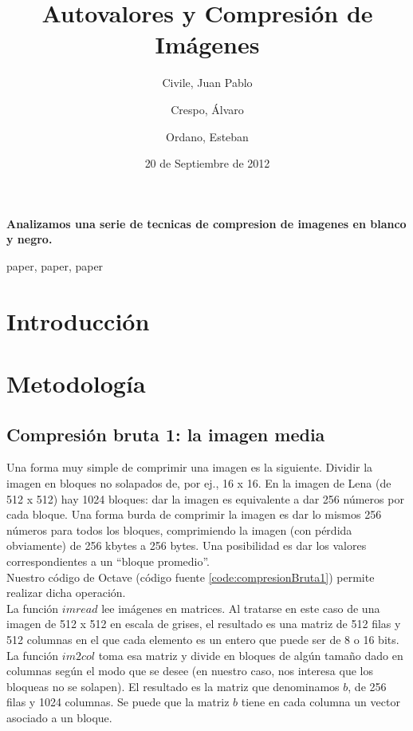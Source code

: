\documentclass[twocolumn,a4paper,10pt]{article}
\title{Autovalores y Compresión de Imágenes}
\date{20 de Septiembre de 2012}
\author{Civile, Juan Pablo \and Crespo, Álvaro \and Ordano, Esteban }
\begin{document}
\pagestyle{fancy}
\maketitle
\thispagestyle{fancy}

\begin{customabstract}
\textbf{
    Analizamos una serie de tecnicas de compresion de imagenes en blanco y negro.
}
\end{customabstract}

\begin{keywords}
paper, paper, paper
\end{keywords}


\section{Introducci\'on}


\section{Metodología}

\subsection{Compresi\'on bruta 1: la imagen media}
\label{sec:compresion1}

Una forma muy simple de comprimir una imagen es la siguiente. Dividir la imagen en bloques no solapados de, por ej., 16 x 16. En la imagen de Lena (de 512 x 512) 
hay 1024 bloques: dar la imagen es equivalente a dar 256 n\'umeros por cada bloque. Una forma burda de comprimir la imagen es dar lo mismos 256 n\'umeros para todos 
los bloques, comprimiendo la imagen (con p\'erdida obviamente) de 256 kbytes a 256 bytes. Una posibilidad es dar los valores correspondientes a un ``bloque promedio''.\\

Nuestro c\'odigo de Octave (c\'odigo fuente \ref{code:compresionBruta1}) permite realizar dicha operaci\'on. \\

La funci\'on $imread$ lee im\'agenes en matrices. Al tratarse en este caso de una imagen de 512 x 512 en escala de grises, el resultado es una matriz de 512 filas y 
512 columnas en el que cada elemento es un entero que puede ser de 8 o 16 bits. La funci\'on $im2col$ toma esa matriz y divide en bloques de alg\'un tamaño dado en 
columnas seg\'un el modo que se desee (en nuestro caso, nos interesa que los bloqueas no se solapen). El resultado es la matriz que denominamos $b$, de 256 filas y 
1024 columnas. Se puede que la matriz $b$ tiene en cada columna un vector asociado a un bloque.  \\
\end{document}
